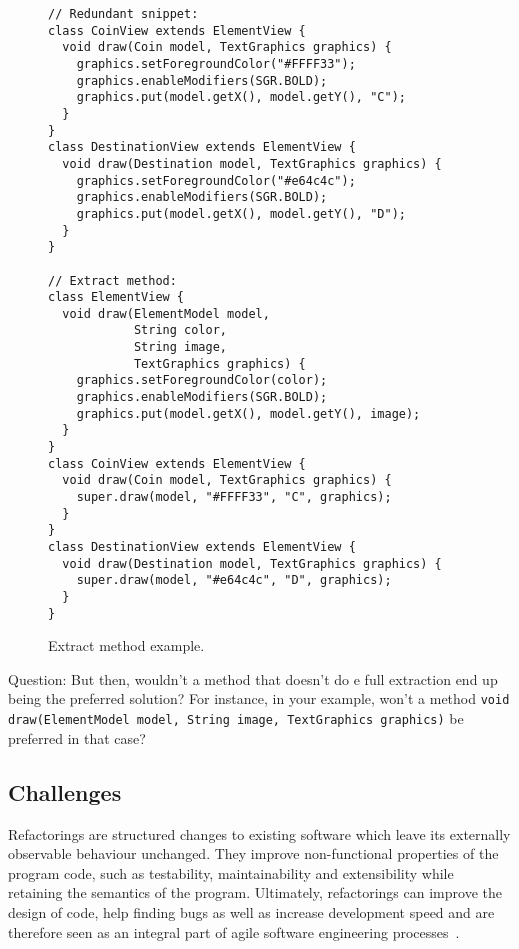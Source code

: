 \documentclass[runningheads,a4paper]{llncs}
\begin{document}
\begin{figure}
\begin{lstlisting}[mathescape=true,showstringspaces=false]
// Redundant snippet:
class CoinView extends ElementView {
  void draw(Coin model, TextGraphics graphics) {
    graphics.setForegroundColor("#FFFF33");
    graphics.enableModifiers(SGR.BOLD);
    graphics.put(model.getX(), model.getY(), "C");
  }
}
class DestinationView extends ElementView {
  void draw(Destination model, TextGraphics graphics) {
    graphics.setForegroundColor("#e64c4c");
    graphics.enableModifiers(SGR.BOLD);
    graphics.put(model.getX(), model.getY(), "D");
  }
}

// Extract method:
class ElementView {
  void draw(ElementModel model,
            String color,
            String image,
            TextGraphics graphics) {
    graphics.setForegroundColor(color);
    graphics.enableModifiers(SGR.BOLD);
    graphics.put(model.getX(), model.getY(), image);
  }
}
class CoinView extends ElementView {
  void draw(Coin model, TextGraphics graphics) {
    super.draw(model, "#FFFF33", "C", graphics);
  }
}
class DestinationView extends ElementView {
  void draw(Destination model, TextGraphics graphics) {
    super.draw(model, "#e64c4c", "D", graphics);
  }
}
\end{lstlisting}
\caption{Extract method example.}
\label{ex:extract-method}
\end{figure}


Question: But then, wouldn't a method that doesn't do e full extraction
end up being the preferred solution? For instance, in your example,
won't a method
\texttt{void draw(ElementModel model, String image,
TextGraphics graphics)} be preferred in that case?


\subsection{Challenges}



Refactorings are structured changes to existing software which leave its
externally observable behaviour unchanged.  They improve non-functional
properties of the program code, such as testability, maintainability and
extensibility while retaining the semantics of the program.  Ultimately,
refactorings can improve the design of code, help finding bugs as well
as increase development speed and are therefore seen as an integral part
of agile software engineering processes~\cite{DBLP:conf/xpu/Kerievsky04b,
Fowler1999}.
\end{document}
